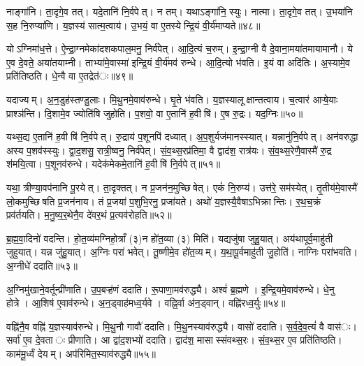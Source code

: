नाङ्गा॑नि। ता॒दृगे॒व तत्। यदे॒तानि॑ नि॒र्वपेत्। न तम्। यथाऽङ्गा॑नि॒ स्युः। नात्मा। ता॒दृगे॒व तत्। उ॒भया॑नि स॒ह नि॒रुप्या॑णि। य॒ज्ञस्य॑ सात्म॒त्वाय॑। उ॒भयं॒ वा ए॒तस्येन्द्रि॒यं वी॒र्य॑माप्यते॥४८॥

योऽग्निमा॑ध॒त्ते। ऐ॒न्द्रा॒ग्नमेका॑दशकपाल॒मनु॒ निर्व॑पेत्। आ॒दि॒त्यं च॒रुम्। इ॒न्द्रा॒ग्नी वै दे॒वाना॒मया॑तमायामानौ। ये ए॒व दे॒वते॒ अया॑तयाम्नी। ताभ्या॑मे॒वास्मा॑ इन्द्रि॒यं वी॒र्य॑मव॑ रुन्धे। आ॒दि॒त्यो भ॑वति। इ॒यं वा अदि॑तिः। अ॒स्यामे॒व प्रति॑तिष्ठति। धे॒न्वै वा ए॒तद्रेत॑ः॥४९॥

यदाज्यम्। अ॒न॒डुह॑स्तण्डु॒लाः। मि॒थु॒नमे॒वाव॑रुन्धे। घृ॒ते भ॑वति। य॒ज्ञस्यालूक्षान्तत्वाय। च॒त्वार॑ आऱ्षे॒याः प्राश्ञ॑न्ति। दि॒शामे॒व ज्योति॑षि जुहोति। प॒शवो॒ वा ए॒तानि॑ ह॒वीषि॑। ए॒ष रु॒द्रः। यद॒ग्निः॥५०॥

यथ्स॒द्य ए॒तानि॑ ह॒वीषि॑ नि॒र्वपेत्। रु॒द्राय॑ प॒शूनपि॑ दध्यात्। अ॒प॒शुर्यज॑मानस्स्यात्। यन्नानु॑नि॒र्वपेत्। अन॑वरुद्धा अस्य प॒शव॑स्स्युः। द्वा॒द॒शसु॒ रात्री॒ष्वनु॒ निर्व॑पेत्। सं॒व॒थ्स॒रप्र॑तिमा॒ वै द्वाद॑श॒ रात्र॑यः। सं॒व॒थ्स॒रेणै॒वास्मै॑ रु॒द्र श॑मयि॒त्वा। प॒शूनव॑रुन्धे। यदेक॑मेकमे॒तानि॑ ह॒वीषि॑ नि॒र्वपेत्॥५१॥

यथा॒ त्रीण्या॒वप॑नानि पू॒रयेत्। ता॒दृक्तत्। न प्र॒जन॑न॒मुच्छिषेत्। एकं॑ नि॒रुप्य॑। उत्त॑रे॒ सम॑स्येत्। तृ॒तीय॑मे॒वास्मै॑ लो॒कमुच्छिषति प्र॒जन॑नाय। तं प्र॒जया॑ प॒शुभि॒रनु॒ प्रजा॑यते। अथो॑ य॒ज्ञस्यै॒वैषाऽभिक्रान्तिः। र॒थ॒च॒क्रं प्रव॑र्तयति। म॒नु॒ष्य॒र॒थेनै॒व दे॑वर॒थं प्र॒त्यव॑रोहति॥५२॥

ब्र॒ह्म॒वा॒दिनो॑ वदन्ति। हो॒त॒व्य॑मग्निहो॒त्राँ (३)न हो॑त॒व्या (३) मिति॑। यद्यजु॑षा जुहु॒यात्। अय॑थापूर्व॒माहु॑ती जुहुयात्। यन्न जु॑हु॒यात्। अ॒ग्निः परा॑ भवेत्। तू॒ष्णीमे॒व हो॑त॒व्यम्। य॒था॒पू॒र्वमाहु॑ती जु॒होति॑। नाग्निः परा॑भवति। अ॒ग्नीधे॑ ददाति॥५३॥

अ॒ग्निमु॑खाने॒वर्तून्प्री॑णाति। उ॒प॒बऱ्ह॑णं ददाति। रू॒पाणा॒मव॑रुद्ध्यै। अश्वं॑ ब्र॒ह्मणे। इ॒न्द्रि॒यमे॒वाव॑रुन्धे। धे॒नु होत्रे। आ॒शिष॑ ए॒वाव॑रुन्धे। अ॒न॒ड्वाह॑मध्व॒र्यवे। वह्नि॒र्वा अ॑न॒ड्वान्। वह्नि॑रध्व॒र्युः॥५४॥

वह्नि॑नै॒व वह्नि॑ य॒ज्ञस्याव॑रुन्धे। मि॒थु॒नौ गावौ॑ ददाति। मि॒थु॒नस्याव॑रुद्ध्यै। वासो॑ ददाति। स॒र्व॒दे॒व॒त्यं॑ वै वास॑ः। सर्वा॑ ए॒व दे॒वताः प्रीणाति। आ द्वा॑द॒शभ्यो॑ ददाति। द्वाद॑श॒ मासास्संवथ्स॒रः। सं॒व॒थ्स॒र ए॒व प्रति॑तिष्ठति। काम॑मू॒र्ध्वं देयम्। अप॑रिमित॒स्याव॑रुद्ध्यै॥५५॥\anuvakamend[आ॒दि॒त्ये तृती॑यम॒फ्स्वासी॒त्तत्तेनावा॑रुन्धत॒ स्यादाप्यते॒ रेतो॒ऽग्निरेक॑मेकमे॒तानि॑ ह॒वीषि॑ नि॒र्वपेत्प्र॒त्यव॑रोहति ददात्यध्व॒र्युर्देय॒मेकं॑ च]

